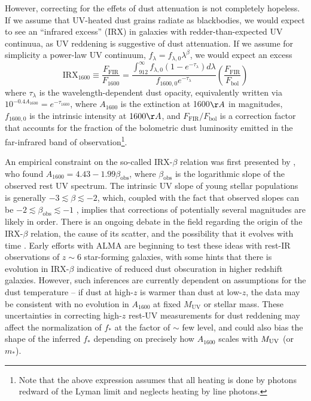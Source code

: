 However, correcting for the effets of dust attenuation is not completely hopeless. If we assume that UV-heated dust grains radiate as blackbodies, we would expect to see an ``infrared excess'' (IRX) in galaxies with redder-than-expected UV continuua, as UV reddening is suggestive of dust attenuation. If we assume for simplicity a power-law UV continuum, $f_{\lambda} = f_{\lambda,0} \lambda^{\beta}$, we would expect an excess
\begin{equation}
	\mathrm{IRX}_{1600} \equiv \frac{F_{\mathrm{FIR}}}{F_{1600}} = \frac{\int_{912}^{\infty} f_{\lambda,0} (1 - e^{-\tau_{\lambda}}) d\lambda}{f_{1600,0} e^{-\tau_{\lambda}}} \left(\frac{F_{\mathrm{FIR}}}{F_{\mathrm{bol}}} \right)
\end{equation}
where $\tau_{\lambda}$ is the wavelength-dependent dust opacity, equivalently written via $10^{-0.4 A_{1600}} = e^{-\tau_{1600}}$, where $A_{1600}$ is the extinction at 1600$\AA$ in magnitudes, $f_{1600,0}$ is the intrinsic intensity at $1600 \AA$, and $F_{\mathrm{FIR}}/F_{\mathrm{bol}}$ is a correction factor that accounts for the fraction of the bolometric dust luminosity emitted in the far-infrared band of observation\footnote{Note that the above expression assumes that all heating is done by photons redward of the Lyman limit and neglects heating by line photons.}. 

An empirical constraint on the so-called IRX-$\beta$ relation was first presented by \cite{Meurer1999}, who found $A_{1600} = 4.43 - 1.99 \beta_{\mathrm{obs}}$, where $\beta_{\mathrm{obs}}$ is the logarithmic slope of the observed rest UV spectrum. The intrinsic UV slope of young stellar populations is generally $-3 \lesssim \beta \lesssim -2$, which, coupled with the fact that observed slopes can be $-2 \lesssim \beta_{\mathrm{obs}} \lesssim -1$ \cite{Finkelstein2012,Bouwens2014}, implies that corrections of potentially several magnitudes are likely in order. There is an ongoing debate in the field regarding the origin of the IRX-$\beta$ relation, the cause of its scatter, and the possibility that it evolves with time \cite{Narayanan2018,Salim2019}. Early efforts with ALMA \cite{Capak2015,Bouwens2016} are beginning to test these ideas with rest-IR observations of $z \sim 6$ star-forming galaxies, with some hints that there is evolution in IRX-$\beta$ indicative of reduced dust obscuration in higher redshift galaxies. However, such inferences are currently dependent on assumptions for the dust temperature -- if dust at high-$z$ is warmer than dust at low-$z$, the data may be consistent with no evolution in $A_{1600}$ at fixed $M_{\mathrm{UV}}$ or stellar mass. These uncertainties in correcting high-$z$ rest-UV measurements for dust reddening may affect the normalization of $f_{\ast}$ at the factor of $\sim$ few level, and could also bias the shape of the inferred $f_{\ast}$ depending on precisely how $A_{1600}$ scales with $M_{\text{UV}}$ (or $m_{\ast}$).

